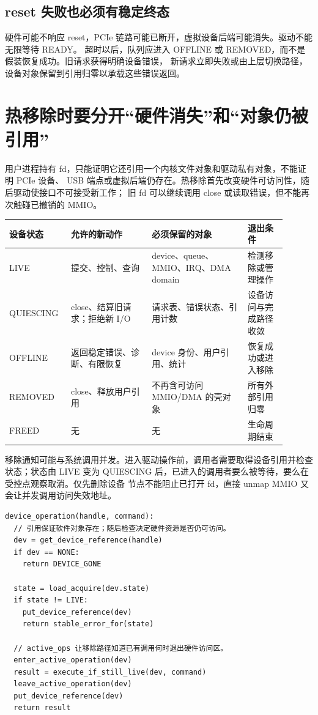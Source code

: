 \subsection{reset 失败也必须有稳定终态}

硬件可能不响应 reset，PCIe 链路可能已断开，虚拟设备后端可能消失。驱动不能无限等待 READY。
超时以后，队列应进入 OFFLINE 或 REMOVED，而不是假装恢复成功。旧请求获得明确设备错误，
新请求立即失败或由上层切换路径，设备对象保留到引用归零以承载这些错误返回。

\section{热移除时要分开“硬件消失”和“对象仍被引用”}

用户进程持有 fd，只能证明它还引用一个内核文件对象和驱动私有对象，不能证明 PCIe 设备、
USB 端点或虚拟后端仍存在。热移除首先改变硬件可访问性，随后驱动使接口不可接受新工作；
旧 fd 可以继续调用 close 或读取错误，但不能再次触碰已撤销的 MMIO。

\begin{longtable}{|L{0.18\linewidth}|L{0.27\linewidth}|L{0.32\linewidth}|L{0.13\linewidth}|}
\hline
设备状态 & 允许的新动作 & 必须保留的对象 & 退出条件 \\ \hline
LIVE & 提交、控制、查询 & device、queue、MMIO、IRQ、DMA domain &
检测移除或管理操作 \\\tablerowrule
QUIESCING & close、结算旧请求；拒绝新 I/O & 请求表、错误状态、引用计数 &
设备访问与完成路径收敛 \\\tablerowrule
OFFLINE & 返回稳定错误、诊断、有限恢复 & device 身份、用户引用、统计 &
恢复成功或进入移除 \\\tablerowrule
REMOVED & close、释放用户引用 & 不再含可访问 MMIO/DMA 的壳对象 &
所有外部引用归零 \\\tablerowrule
FREED & 无 & 无 & 生命周期结束 \\ \hline
\end{longtable}

移除通知可能与系统调用并发。进入驱动操作前，调用者需要取得设备引用并检查状态；状态由
LIVE 变为 QUIESCING 后，已进入的调用者要么被等待，要么在受控点观察取消。仅先删除设备
节点不能阻止已打开 fd，直接 unmap MMIO 又会让并发调用访问失效地址。

\begin{lstlisting}
device_operation(handle, command):
  // 引用保证软件对象存在；随后检查决定硬件资源是否仍可访问。
  dev = get_device_reference(handle)
  if dev == NONE:
    return DEVICE_GONE

  state = load_acquire(dev.state)
  if state != LIVE:
    put_device_reference(dev)
    return stable_error_for(state)

  // active_ops 让移除路径知道已有调用何时退出硬件访问区。
  enter_active_operation(dev)
  result = execute_if_still_live(dev, command)
  leave_active_operation(dev)
  put_device_reference(dev)
  return result
\end{lstlisting}

